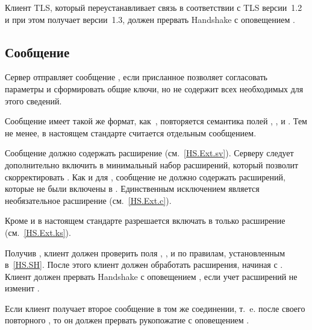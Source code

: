Клиент TLS, который переустанавливает связь в соответствии с TLS версии~1.2 и 
при этом получает  версии~1.3, должен прервать Handshake с 
оповещением .

\subsection{Сообщение }\label{HS.HRR} 

Сервер отправляет сообщение , если присланное 
 позволяет согласовать параметры и сформировать общие 
ключи, но не содержит всех необходимых для этого сведений.

Сообщение  имеет такой же формат, 
как~, повторяется семантика полей 
, ,  и 
.
%
Тем не менее, в настоящем стандарте  считается 
отдельным сообщением. 

Сообщение  должно содержать расширение 
 (см.~\ref{HS.Ext.sv}). Серверу следует 
дополнительно включить в  минимальный набор 
расширений, который позволит скорректировать .
%
Как и для , сообщение  не
должно содержать расширений, которые не были включены в
. Единственным исключением является необязательное
расширение  (см.~\ref{HS.Ext.c}).

Кроме  и  в 
настоящем стандарте разрешается включать в  только 
расширение  (см.~\ref{HS.Ext.ks}).

Получив , клиент должен проверить поля
, , 
 и  по правилам,
установленным в~\ref{HS.SH}.
%
После этого клиент должен обработать расширения, начиная с 
. 
%
Клиент должен прервать Handshake с оповещением
, если учет расширений
 не изменит .

Если клиент получает второе сообщение  в том же
соединении, т.~e. после своего повторного , то он
должен прервать рукопожатие с оповещением
.

